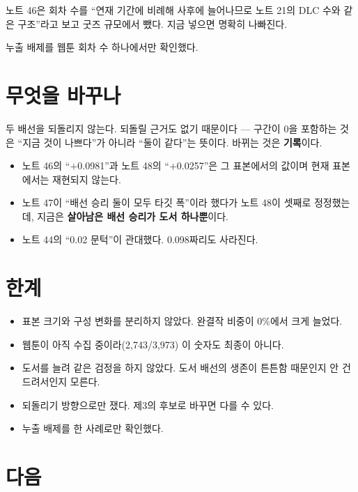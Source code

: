 \documentclass[10pt]{article}
\begin{document}
노트 46은 회차 수를 ``연재 기간에 비례해 사후에 늘어나므로 노트 21의 DLC 수와
같은 구조''라고 보고 굿즈 규모에서 뺐다. 지금 넣으면 명확히 나빠진다.

{누출 배제를 웹툰 회차 수 하나에서만 확인했다.}

\section{무엇을 바꾸나}

두 배선을 되돌리지 않는다. 되돌릴 근거도 없기 때문이다 --- 구간이 0을 포함하는
것은 ``지금 것이 나쁘다''가 아니라 ``둘이 같다''는 뜻이다. 바뀌는 것은
\textbf{기록}이다.

\begin{itemize}[leftmargin=1.1em,itemsep=0.15em]
\item 노트 46의 ``$+$0.0981''과 노트 48의 ``$+$0.0257''은 그 표본에서의 값이며
      현재 표본에서는 재현되지 않는다.
\item 노트 47이 ``배선 승리 둘이 모두 타깃 폭''이라 했다가 노트 48이 셋째로
      정정했는데, 지금은 \textbf{살아남은 배선 승리가 도서 하나뿐}이다.
\item 노트 44의 ``0.02 문턱''이 관대했다. 0.098짜리도 사라진다.
\end{itemize}

\section{한계}

\begin{itemize}[leftmargin=1.1em,itemsep=0.15em]
\item 표본 크기와 구성 변화를 분리하지 않았다. 완결작 비중이 0\%에서 크게 늘었다.
\item 웹툰이 아직 수집 중이라(2,743/3,973) 이 숫자도 최종이 아니다.
\item 도서를 늘려 같은 검정을 하지 않았다. 도서 배선의 생존이 튼튼함 때문인지
      안 건드려서인지 모른다.
\item 되돌리기 방향으로만 쟀다. 제3의 후보로 바꾸면 다를 수 있다.
\item 누출 배제를 한 사례로만 확인했다.
\end{itemize}

\section{다음}
\end{document}
